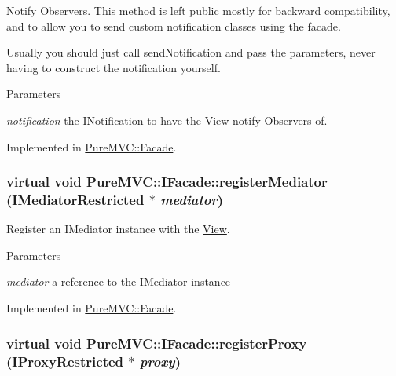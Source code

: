 Notify {\ttfamily \hyperlink{class_pure_m_v_c_1_1_observer}{Observer}}s. This method is left public mostly for backward compatibility, and to allow you to send custom notification classes using the facade. 

Usually you should just call sendNotification and pass the parameters, never having to construct the notification yourself.


\begin{DoxyParams}{Parameters}
\item[{\em notification}]the {\ttfamily \hyperlink{class_pure_m_v_c_1_1_i_notification}{INotification}} to have the {\ttfamily \hyperlink{class_pure_m_v_c_1_1_view}{View}} notify {\ttfamily Observers} of. \end{DoxyParams}


Implemented in \hyperlink{class_pure_m_v_c_1_1_facade_a605e0e774d8d4d9b31fcb040a14fec77}{PureMVC::Facade}.\hypertarget{class_pure_m_v_c_1_1_i_facade_af6849105c64d8841afce1cf7bb2b4d84}{
\subsubsection[{registerMediator}]{\setlength{\rightskip}{0pt plus 5cm}virtual void PureMVC::IFacade::registerMediator ({\bf IMediatorRestricted} $\ast$ {\em mediator})}}
\label{class_pure_m_v_c_1_1_i_facade_af6849105c64d8841afce1cf7bb2b4d84}


Register an {\ttfamily IMediator} instance with the {\ttfamily \hyperlink{class_pure_m_v_c_1_1_view}{View}}. 
\begin{DoxyParams}{Parameters}
\item[{\em mediator}]a reference to the {\ttfamily IMediator} instance \end{DoxyParams}


Implemented in \hyperlink{class_pure_m_v_c_1_1_facade_a3c0ead374ba222146a7fe5a59eb0fcb4}{PureMVC::Facade}.\hypertarget{class_pure_m_v_c_1_1_i_facade_a510b704a75bb052bbccd816ac30a5df0}{
\subsubsection[{registerProxy}]{\setlength{\rightskip}{0pt plus 5cm}virtual void PureMVC::IFacade::registerProxy ({\bf IProxyRestricted} $\ast$ {\em proxy})}}
\label{class_pure_m_v_c_1_1_i_facade_a510b704a75bb052bbccd816ac30a5df0}


